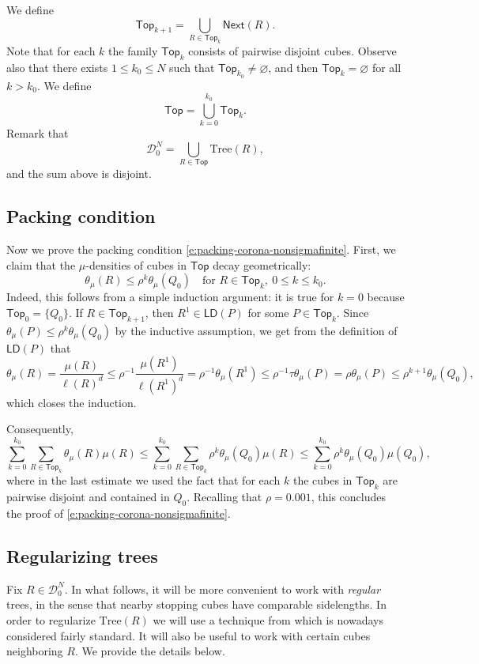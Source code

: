 \documentclass[11pt,reqno]{amsart}
\newcommand{\LD}{\mathsf{LD}}
\newcommand{\Top}{\mathsf{Top}}
\newcommand{\Tr}{\mathrm{Tree}}
\theoremstyle{definition}
\theoremstyle{remark}
\numberwithin{equation}{section}
\newcommand{\DD}{\mathcal{D}}
\newcommand{\Next}{\mathsf{Next}}
\theoremstyle{theorem}
\theoremstyle{definition}
\theoremstyle{remark}
\numberwithin{equation}{section}
\begin{document}
    We define
	\begin{equation*}
	\Top_{k+1} = \bigcup_{R\in\Top_k} \Next(R).
	\end{equation*}
	Note that for each $k$ the family $\Top_k$ consists of pairwise disjoint cubes. Observe also that there exists $1\le k_0\le N$ such that $\Top_{k_0}\neq\varnothing$, and then $\Top_k=\varnothing$ for all $k> k_0$. We define
	\begin{equation*}
		\Top = \bigcup_{k=0}^{k_0}\Top_k.
	\end{equation*}
	Remark that
	\begin{equation*}
		\DD_0^N = \bigcup_{R\in\Top}\Tr(R),
	\end{equation*}
	and the sum above is disjoint.

\subsection{Packing condition}
Now we prove the packing condition \eqref{e:packing-corona-nonsigmafinite}.
  First, we claim that the $\mu$-densities of cubes in $\Top$ decay geometrically: 
  \begin{equation*}
      \theta_\mu(R)\le \rho^{k}\theta_\mu(Q_0)\quad\text{for $R\in\Top_k,\ 0\le k\le k_0.$}
  \end{equation*}  
  Indeed, this follows from a simple induction argument: it is true for $k=0$ because $\Top_0=\{Q_0\}$. If $R\in\Top_{k+1}$, then $R^1\in\LD(P)$ for some $P\in\Top_k$. Since $\theta_\mu(P)\le \rho^{k}\theta_\mu(Q_0)$ by the inductive assumption, we get from the definition of $\LD(P)$ that
	\begin{equation*}
		\theta_\mu(R)=\frac{\mu(R)}{\ell(R)^d}\le\rho^{-1}\frac{\mu(R^1)}{\ell(R^1)^d} = \rho^{-1}\theta_\mu(R^1)\le\rho^{-1}  \tau\theta_\mu(P)
  = \rho\theta_\mu(P)\le \rho^{k+1}\theta_\mu(Q_0),
	\end{equation*}
	which closes the induction.
	
	Consequently,
	\begin{equation*}
		\sum_{k=0}^{k_0}\sum_{R\in\Top_k}\theta_\mu(R)\mu(R) \le \sum_{k=0}^{k_0}\sum_{R\in\Top_k}\rho^k\theta_\mu(Q_0)\mu(R) \le \sum_{k=0}^{k_0} \rho^k \theta_\mu(Q_0)\mu(Q_0),
	\end{equation*}
	where in the last estimate we used the fact that for each $k$ the cubes in $\Top_k$ are pairwise disjoint and contained in $Q_0$. Recalling that $\rho=0.001$, this concludes the proof of \eqref{e:packing-corona-nonsigmafinite}.
	
	\subsection{Regularizing trees}\label{subsec:regularizing}
	Fix $R\in\DD_0^{N}$. In what follows, it will be more convenient to work with \emph{regular} trees, in the sense that nearby stopping cubes have comparable sidelengths. In order to regularize $\Tr(R)$ we will use a technique from \cite{david1991singular} which is nowadays considered fairly standard. It will also be useful to work with certain cubes neighboring $R$. We provide the details below.
	
\end{document}
